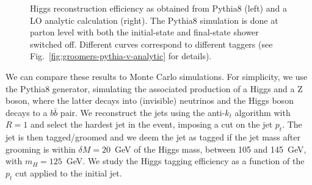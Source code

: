 \begin{figure}[t!]
  \hfill%
  \caption{Higgs reconstruction efficiency as obtained from Pythia8
    (left) and a LO analytic calculation (right). The Pythia8
    simulation is done at parton level with both the initial-state and
    final-state shower switched off. Different curves correspond to
    different taggers (see \eg
    Fig.~\ref{fig:groomers-pythia-v-analytic} for
    details).}\label{fig:groomers-pythia-sig-hard}
\end{figure}

We can compare these results to Monte Carlo simulations. 
%
For simplicity, we use the Pythia8 generator, simulating the
associated production of a Higgs and a Z boson, where the latter decays into (invisible)
neutrinos and the Higgs boson decays to a $b\bar b$ pair. We
reconstruct the jets using the anti-$k_t$ algorithm with $R=1$ and
select the hardest jet in the event, imposing a cut on the jet
$p_t$. The jet is then tagged/groomed and we deem the
jet as tagged if the jet mass after grooming is within
$\delta M=20$~GeV of the Higgs mass, \ie between 105 and 145~GeV,
with $m_H=125$~GeV.
%
We study the Higgs tagging efficiency as a function of the $p_t$ cut
applied to the initial jet.

